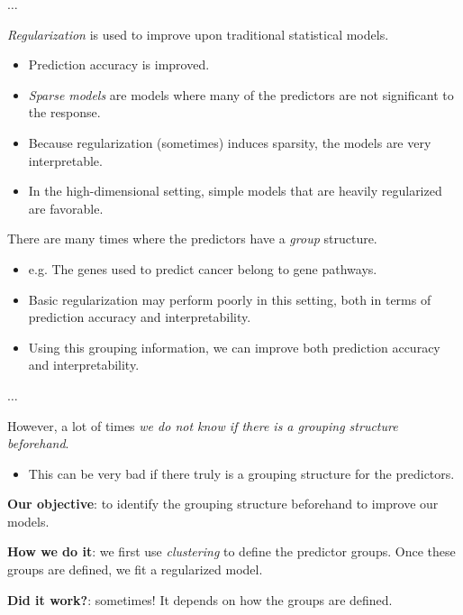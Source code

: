\documentclass[8pt]{beamer}
\newcommand{\mys}{\vspace{0.5cm} %
}
\begin{document}
\begin{frame}{\color{white}$\ldots$}

\textit{Regularization} is used to improve upon traditional statistical models.
\begin{itemize}
    \item Prediction accuracy is improved.
    \item \textit{Sparse models} are models where many of the predictors are not significant to the response.
    \item Because regularization (sometimes) induces sparsity, the models are very interpretable.
    \item In the high-dimensional setting, simple models that are heavily regularized are favorable.
\end{itemize} \mys

There are many times where the predictors have a \textit{group} structure. 
\begin{itemize}
    \item e.g. The genes used to predict cancer belong to gene pathways.
    \item Basic regularization may perform poorly in this setting, both in terms of prediction accuracy and interpretability.
    \item Using this grouping information, we can improve both prediction accuracy and interpretability.
\end{itemize} %

    
\end{frame}

\begin{frame}{$\ldots$}

However, a lot of times \textit{we do not know if there is a grouping structure beforehand}. 
\begin{itemize}
    \item This can be very bad if there truly is a grouping structure for the predictors.
\end{itemize} \mys

\textbf{Our objective}: to identify the grouping structure beforehand to improve our models. \mys

\textbf{How we do it}: we first use \textit{clustering} to define the predictor groups. Once these groups are defined, we fit a regularized model. \mys 

\textbf{Did it work?}: sometimes! It depends on how the groups are defined.
    
\end{frame}
\end{document}
